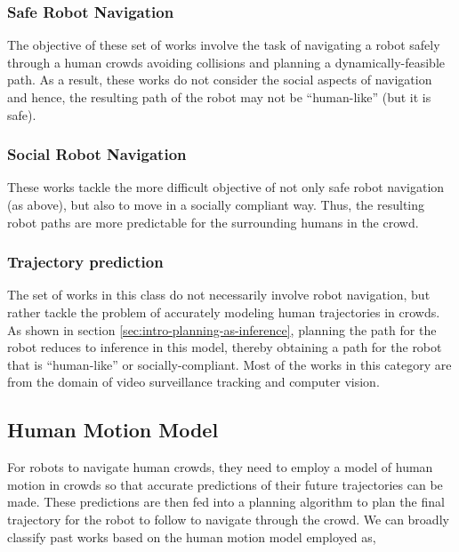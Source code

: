 \subsubsection{Safe Robot Navigation}
\label{sec:safe-robot-navig}

The objective of these set of works involve the task of navigating a robot safely through a human crowds avoiding collisions and planning a dynamically-feasible path. As a result, these works do not consider the social aspects of navigation and hence, the resulting path of the robot may not be ``human-like'' (but it is safe).

\subsubsection{Social Robot Navigation}
\label{sec:soci-robot-navig}

These works tackle the more difficult objective of not only safe robot navigation (as above), but also to move in a socially compliant way. Thus, the resulting robot paths are more predictable for the surrounding humans in the crowd.

\subsubsection{Trajectory prediction}
\label{sec:traj-pred}

The set of works in this class do not necessarily involve robot navigation, but rather tackle the problem of accurately modeling human trajectories in crowds. As shown in section \ref{sec:intro-planning-as-inference}, planning the path for the robot reduces to inference in this model, thereby obtaining a path for the robot that is ``human-like'' or socially-compliant. Most of the works in this category are from the domain of video surveillance tracking and computer vision.



\subsection{Human Motion Model}
\label{sec:human-motion-model}

For robots to navigate human crowds, they need to employ a model of human motion in crowds so that accurate predictions of their future trajectories can be made. These predictions are then fed into a planning algorithm to plan the final trajectory for the robot to follow to navigate through the crowd. We can broadly classify past works based on the human motion model employed as,

